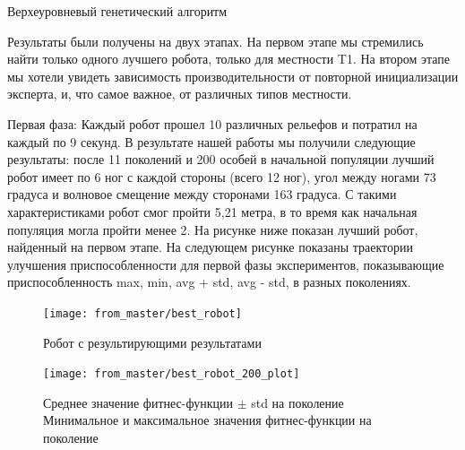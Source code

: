 \begin{algorithm}[h]
\caption{Верхеуровневый генетический алгоритм\label{high_level}}
\end{algorithm}

Результаты были получены на двух этапах. На первом этапе мы стремились найти только одного лучшего робота, только для местности T1. На втором этапе мы хотели увидеть зависимость производительности от повторной инициализации эксперта, и, что самое важное, от различных типов местности. 

Первая фаза: Каждый робот прошел 10 различных рельефов и потратил на каждый по 9 секунд.
В результате нашей работы мы получили следующие результаты: после 11 поколений и 200 особей в начальной популяции лучший робот имеет по 6 ног с каждой стороны (всего 12 ног), угол между ногами 73 градуса и волновое смещение между сторонами 163 градуса. С такими характеристиками робот смог пройти 5,21 метра, в то время как начальная популяция могла пройти менее 2. На рисунке ниже  показан лучший робот, найденный на первом этапе. На следующем рисунке  показаны траектории улучшения приспособленности для первой фазы экспериментов, показывающие приспособленность max, min, avg + std, avg - std, в разных поколениях. 


\begin{figure}[H]
\centering\texttt{[image: from\_master/best\_robot]}\\
\caption{Робот с результирующими результатами}
\label{fig:best_robot}
\end{figure}
\begin{figure}[H]
\centering\texttt{[image: from\_master/best\_robot\_200\_plot]}\\
\caption{Среднее значение фитнес-функции $\pm$ std на поколение
Минимальное и максимальное значения фитнес-функции на поколение}
\label{fig:plot4}
\end{figure}

